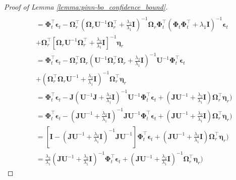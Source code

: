\begin{proof}[Proof of Lemma \ref{lemma:pinn-bo_confidence_bound}]
\begin{align*}
\\
       &=\boldsymbol{\Phi}_t^\top \boldsymbol{\epsilon}_t - \boldsymbol{\Omega}_r^\top \left(\boldsymbol{\Omega}_r\mathbf{U}^{-1} \boldsymbol{\Omega}_r^\top + \frac{\lambda_2}{\lambda_1}\mathbf{I}\right)^{-1} \boldsymbol{\Omega}_r \boldsymbol{\Phi}_t^\top (\boldsymbol{\Phi}_t\boldsymbol{\Phi}_t^\top + \lambda_1\mathbf{I})^{-1}\boldsymbol{\epsilon}_t  
\\
       & + \boldsymbol{\Omega}_r^\top\left[\boldsymbol{\Omega}_r\mathbf{U}^{-1} \boldsymbol{\Omega}_r^\top + \frac{\lambda_2}{\lambda_1}\mathbf{I}\right]^{-1}\boldsymbol{\eta}_r 
       \\
       & = \boldsymbol{\Phi}_t^\top \boldsymbol{\epsilon}_t - \boldsymbol{\Omega}_r^\top \boldsymbol{\Omega}_r \left(\mathbf{U}^{-1}\boldsymbol{\Omega}_r^\top \boldsymbol{\Omega}_r + \frac{\lambda_2}{\lambda_1}\mathbf{I} \right)^{-1} \mathbf{U}^{-1} \boldsymbol{\Phi}_t^\top \boldsymbol{\epsilon}_t 
       \\
       & + \left(\boldsymbol{\Omega}_r^\top \boldsymbol{\Omega}_r\mathbf{U}^{-1} +  \frac{\lambda_2}{\lambda_1}\mathbf{I}\right) ^{-1} \boldsymbol{\Omega}_r^\top \boldsymbol{\eta}_r  
       \\
       & = \boldsymbol{\Phi}_t^\top \boldsymbol{\epsilon}_t - \mathbf{J} \left(\mathbf{U}^{-1} \mathbf{J} + \frac{\lambda_2}{\lambda_1}\mathbf{I} \right)^{-1} \mathbf{U}^{-1} \boldsymbol{\Phi}_t^\top \boldsymbol{\epsilon}_t + \left(\mathbf{J} \mathbf{U}^{-1} + \frac{\lambda_2}{\lambda_1}\mathbf{I}\right) \boldsymbol{\Omega}_r^\top \boldsymbol{\eta}_r) 
\\
       & = \boldsymbol{\Phi}_t^\top \boldsymbol{\epsilon}_t -  \left(\mathbf{J}\mathbf{U}^{-1}  + \frac{\lambda_2}{\lambda_1}\mathbf{I} \right)^{-1} \mathbf{J}\mathbf{U}^{-1} \boldsymbol{\Phi}_t^\top \boldsymbol{\epsilon}_t + \left(\mathbf{J} \mathbf{U}^{-1} + \frac{\lambda_2}{\lambda_1}\mathbf{I}\right) \boldsymbol{\Omega}_r^\top \boldsymbol{\eta}_r) 
\\ 
       & = \left[ \mathbf{I} -\left(\mathbf{J}\mathbf{U}^{-1}  + \frac{\lambda_2}{\lambda_1}\mathbf{I} \right)^{-1} \mathbf{J}\mathbf{U}^{-1} \right] \boldsymbol{\Phi}_t^\top \boldsymbol{\epsilon}_t + \left(\mathbf{J} \mathbf{U}^{-1} + \frac{\lambda_2}{\lambda_1}\mathbf{I}\right) \boldsymbol{\Omega}_r^\top \boldsymbol{\eta}_r) 
\\
       & = \frac{\lambda_2}{\lambda_1} \left(\mathbf{J}\mathbf{U}^{-1}  + \frac{\lambda_2}{\lambda_1}\mathbf{I} \right)^{-1}\boldsymbol{\Phi}_t^\top \boldsymbol{\epsilon}_t +  \left(\mathbf{J}\mathbf{U}^{-1}  + \frac{\lambda_2}{\lambda_1}\mathbf{I} \right)^{-1}\boldsymbol{\Omega}_r^\top \boldsymbol{\eta}_r) 

\end{align*}
\end{proof}
